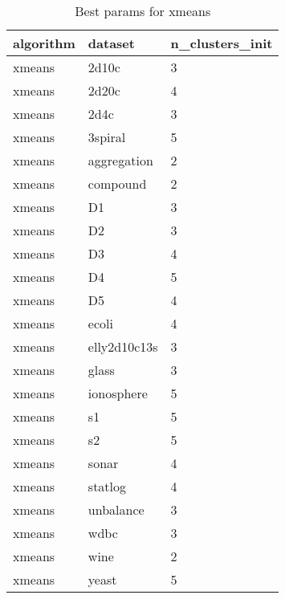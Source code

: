 \begin{table}[H]
\centering
\caption{Best params for xmeans}
\label{tab:params:xmeans}
\begin{tabular}{|l|l|l|}
\hline
algorithm & dataset & n\_clusters\_init \\
\hline
xmeans & 2d10c & 3 \\
\hline
xmeans & 2d20c & 4 \\
\hline
xmeans & 2d4c & 3 \\
\hline
xmeans & 3spiral & 5 \\
\hline
xmeans & aggregation & 2 \\
\hline
xmeans & compound & 2 \\
\hline
xmeans & D1 & 3 \\
\hline
xmeans & D2 & 3 \\
\hline
xmeans & D3 & 4 \\
\hline
xmeans & D4 & 5 \\
\hline
xmeans & D5 & 4 \\
\hline
xmeans & ecoli & 4 \\
\hline
xmeans & elly2d10c13s & 3 \\
\hline
xmeans & glass & 3 \\
\hline
xmeans & ionosphere & 5 \\
\hline
xmeans & s1 & 5 \\
\hline
xmeans & s2 & 5 \\
\hline
xmeans & sonar & 4 \\
\hline
xmeans & statlog & 4 \\
\hline
xmeans & unbalance & 3 \\
\hline
xmeans & wdbc & 3 \\
\hline
xmeans & wine & 2 \\
\hline
xmeans & yeast & 5 \\
\hline
\end{tabular}
\end{table}